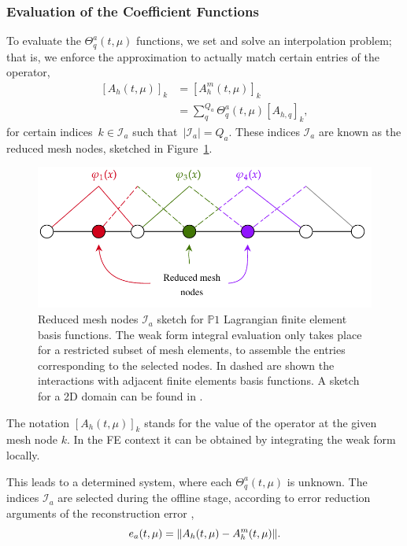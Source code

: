 \documentclass[../../thesis.tex]{subfiles}
\begin{document}
\subsubsection{Evaluation of the Coefficient Functions}
To evaluate the $\Theta_q^a(t, \mu)$ functions, we set and solve an interpolation problem;
that is, we enforce the approximation to actually match certain entries of the operator, 
\begin{equation}
    \begin{split}
        [A_h(t, \mu)]_{k} &= [A_h^m(t, \mu)]_{k} \\
                          &= \sum_q^{Q_a} \Theta_q^a(t, \mu) [A_{h, q}]_{k}, 
    \end{split}
    \label{eq:1d_rom_burgers_interpolation_problem}
\end{equation}
for certain indices~$k \in \mathcal{I}_a$ such that~$\left|\mathcal{I}_a\right| = Q_a$.
These indices $\mathcal{I}_a$ are known as the reduced mesh nodes, 
sketched in Figure~\ref{fig:reduced_mesh}.
\begin{figure}[h]
    \centering
    \includegraphics[width=0.90\columnwidth]{research_project/piston/figures/reduced_mesh_nodes.pdf}
    \caption{Reduced mesh nodes $\mathcal{I}_a$ sketch 
    for $\mathbb{P}1$ Lagrangian finite element basis functions. 
    The weak form integral evaluation only takes place for a restricted subset of mesh elements,
    to assemble the entries corresponding to the selected nodes.  
    In dashed are shown the interactions with adjacent finite elements basis functions.
    A sketch for a 2D domain can be found in \cite{2015_efficientModelReductionParametrizedSystemsMatrixDeim_Negri}.}
    \label{fig:reduced_mesh}
\end{figure}
The notation $[A_h(t, \mu)]_{k}$ stands for the value of the operator at the given mesh node $k$.
In the FE context it can be obtained by integrating the weak form locally.

This leads to a determined system, where each $\Theta_q^a(t, \mu)$ is unknown.
The indices $\mathcal{I}_a$ are selected during the offline stage, 
according to error reduction arguments of the reconstruction error
\cite{2010_nonlinearModelReductionDeim_chaturantabut},
\begin{equation}
    e_a(t, \mu) = \norm{A_h(t, \mu) - A_h^m(t, \mu)}.
\end{equation}
\end{document}
